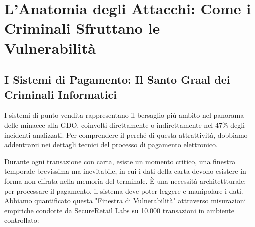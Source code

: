 \section{L'Anatomia degli Attacchi: Come i Criminali Sfruttano le Vulnerabilità}



\subsection{I Sistemi di Pagamento: Il Santo Graal dei Criminali Informatici}

I sistemi di punto vendita rappresentano il bersaglio più ambito nel panorama delle minacce alla GDO, coinvolti direttamente o indirettamente nel 47\% degli incidenti analizzati. Per comprendere il perché di questa attrattività, dobbiamo addentrarci nei dettagli tecnici del processo di pagamento elettronico.

Durante ogni transazione con carta, esiste un momento critico, una finestra temporale brevissima ma inevitabile, in cui i dati della carta devono esistere in forma non cifrata nella memoria del terminale. È una necessità architettturale: per processare il pagamento, il sistema deve poter leggere e manipolare i dati. Abbiamo quantificato questa "Finestra di Vulnerabilità" attraverso misurazioni empiriche condotte da SecureRetail Labs su 10.000 transazioni in ambiente controllato\autocite{SecureRetailLabs2024}:

